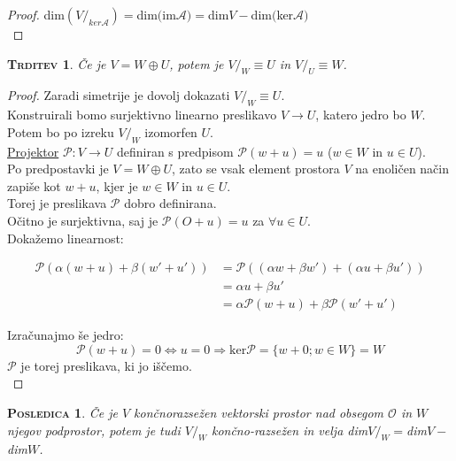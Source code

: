 \documentclass[a4paper,12pt]{article}
\newcommand{\A}{\mathcal{A}}
\newtheorem*{trditev}{\textsc{Trditev}}
\newtheorem*{posledica}{\textsc{Posledica}}
\begin{document}
\begin{proof}
	dim$(V/_{ker \A })=$dim$($im$\A)=$dim$V-$dim$($ker$\A)$ \\
\end{proof}

\begin{trditev}
	Če je $V=W\oplus U$, potem je $V/_W \equiv U$ in $V/_U \equiv W$.\\
\end{trditev}

\begin{proof}
	Zaradi simetrije je dovolj dokazati $V/_W \equiv U$. \\

	Konstruirali bomo surjektivno linearno preslikavo $V\to U$, katero jedro bo $W$. \\

	Potem bo po izreku $V/_W$ izomorfen $U$. \\

	\underline{Projektor} $\mathcal{P}:V\to U$ definiran s predpisom $\mathcal{P}(w+u)=u$ ($w\in W$ in $u\in U$). \\

	Po predpostavki je $V=W\oplus U$, zato se vsak element prostora $V$ na enoličen način zapiše kot $w+u$, kjer je $w\in W$ in $u\in U$. \\

	Torej je preslikava $\mathcal{P}$ dobro definirana. \\

	Očitno je surjektivna, saj je $\mathcal{P}(O+u)=u$ za $\forall u\in U$. \\

	Dokažemo linearnost: 

	\begin{align*}
		\mathcal{P}(\alpha(w+u)+\beta(w'+u'))&=\mathcal{P}((\alpha w + \beta w')+(\alpha u+\beta u')) \\
		&= \alpha u + \beta u' \\
		&= \alpha \mathcal{P}(w+u)+\beta \mathcal{P}(w'+u')
	\end{align*}

	Izračunajmo še jedro:
	\begin{equation*}
		\mathcal{P}(w+u)=0 \Leftrightarrow u=0 \Rightarrow \text{ker}\mathcal{P}=\{w+0;w\in W\}=W
	\end{equation*}
	$\mathcal{P}$ je torej preslikava, ki jo iščemo.\\
\end{proof}

\begin{posledica}
	Če je $V$ končnorazsežen vektorski prostor nad obsegom $\mathcal{O}$ in $W$ njegov podprostor, potem je tudi $V/_W$ končno-razsežen in velja dim$V/_W=$dim$V-$dim$W$. \\
\end{posledica}
\end{document}
